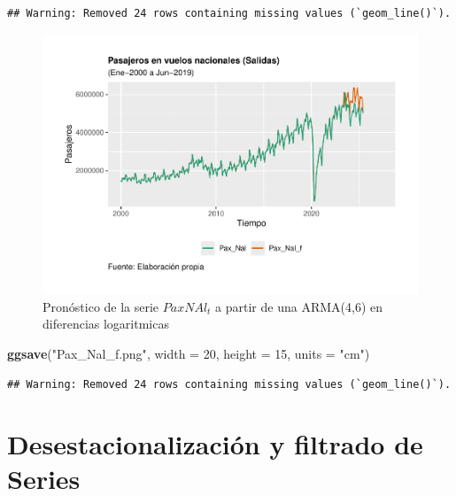 \documentclass[
]{book}
\newenvironment{Shaded}{\begin{snugshade}}{\end{snugshade}}
\newcommand{\AttributeTok}[1]{\textcolor[rgb]{0.13,0.29,0.53}{#1}}
\newcommand{\DecValTok}[1]{\textcolor[rgb]{0.00,0.00,0.81}{#1}}
\newcommand{\FunctionTok}[1]{\textcolor[rgb]{0.13,0.29,0.53}{\textbf{#1}}}
\newcommand{\NormalTok}[1]{#1}
\newcommand{\StringTok}[1]{\textcolor[rgb]{0.31,0.60,0.02}{#1}}
\begin{document}
\begin{verbatim}
## Warning: Removed 24 rows containing missing values (`geom_line()`).
\end{verbatim}

\begin{figure}

{\centering \includegraphics{Notas-Series-Tiempo_files/figure-latex/fig417-1} 

}

\caption{Pronóstico de la serie $PaxNAl_t$ a partir de una ARMA(4,6) en diferencias logaritmicas}\label{fig:fig417}
\end{figure}

\begin{Shaded}
\begin{Highlighting}[]
\FunctionTok{ggsave}\NormalTok{(}\StringTok{"Pax\_Nal\_f.png"}\NormalTok{, }\AttributeTok{width =} \DecValTok{20}\NormalTok{, }\AttributeTok{height =} \DecValTok{15}\NormalTok{, }\AttributeTok{units =} \StringTok{"cm"}\NormalTok{)}
\end{Highlighting}
\end{Shaded}

\begin{verbatim}
## Warning: Removed 24 rows containing missing values (`geom_line()`).
\end{verbatim}

\hypertarget{desestacionalizaciuxf3n-y-filtrado-de-series}{%
\chapter{Desestacionalización y filtrado de Series}\label{desestacionalizaciuxf3n-y-filtrado-de-series}}
\end{document}
